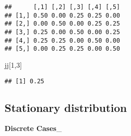 \documentclass[]{book}
\newenvironment{Shaded}{\begin{snugshade}}{\end{snugshade}}
\newcommand{\KeywordTok}[1]{\textcolor[rgb]{0.13,0.29,0.53}{\textbf{#1}}}
\newcommand{\DataTypeTok}[1]{\textcolor[rgb]{0.13,0.29,0.53}{#1}}
\newcommand{\DecValTok}[1]{\textcolor[rgb]{0.00,0.00,0.81}{#1}}
\newcommand{\FloatTok}[1]{\textcolor[rgb]{0.00,0.00,0.81}{#1}}
\newcommand{\StringTok}[1]{\textcolor[rgb]{0.31,0.60,0.02}{#1}}
\newcommand{\CommentTok}[1]{\textcolor[rgb]{0.56,0.35,0.01}{\textit{#1}}}
\newcommand{\OtherTok}[1]{\textcolor[rgb]{0.56,0.35,0.01}{#1}}
\newcommand{\OperatorTok}[1]{\textcolor[rgb]{0.81,0.36,0.00}{\textbf{#1}}}
\newcommand{\NormalTok}[1]{#1}
\begin{document}
\begin{Shaded}
\end{Shaded}

\begin{verbatim}
##      [,1] [,2] [,3] [,4] [,5]
## [1,] 0.50 0.00 0.25 0.25 0.00
## [2,] 0.00 0.50 0.00 0.25 0.25
## [3,] 0.25 0.00 0.50 0.00 0.25
## [4,] 0.25 0.25 0.00 0.50 0.00
## [5,] 0.00 0.25 0.25 0.00 0.50
\end{verbatim}

\begin{Shaded}
\begin{Highlighting}[]
\NormalTok{jj[}\DecValTok{1}\NormalTok{,}\DecValTok{3}\NormalTok{]}
\end{Highlighting}
\end{Shaded}

\begin{verbatim}
## [1] 0.25
\end{verbatim}

\subsection{Stationary distribution}\label{stationary-distribution}

\textbf{Discrete Cases}\_

\begin{Shaded}
\end{Shaded}
\end{document}
